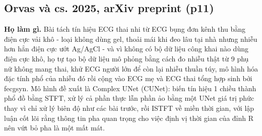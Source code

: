 \documentclass[12pt,a4paper]{article}
\begin{document}
\subsection{Orvas và cs. 2025, arXiv preprint \normalfont\small (p11)}
\par\vspace{2pt}
\par\vspace{4pt}
\noindent \textbf{Họ làm gì.} Bài tách tín hiệu ECG thai nhi từ ECG bụng đơn kênh thu bằng điện cực vải khô - loại không dùng gel, thoải mái khi đeo lâu tại nhà nhưng nhiễu hơn hẳn điện cực ướt Ag/AgCl - và vì không có bộ dữ liệu công khai nào dùng điện cực khô, họ tự tạo bộ dữ liệu mô phỏng bằng cách đo nhiễu thật từ 9 phụ nữ không mang thai, khử ECG người lớn để còn lại nhiễu thuần túy, mô hình hóa đặc tính phổ của nhiễu đó rồi cộng vào ECG mẹ và ECG thai tổng hợp sinh bởi fecgsyn. Mô hình đề xuất là Complex UNet (CUNet): biến tín hiệu 1 chiều thành phổ đồ bằng STFT, xử lý cả phần thực lẫn phần ảo bằng một UNet giá trị phức thay vì chỉ xử lý biên độ như các bài trước, rồi ISTFT về miền thời gian, với lập luận cốt lõi rằng thông tin pha quan trọng cho việc định vị thời gian của đỉnh R nên vứt bỏ pha là một mất mát.\par\vspace{3pt}
\end{document}
